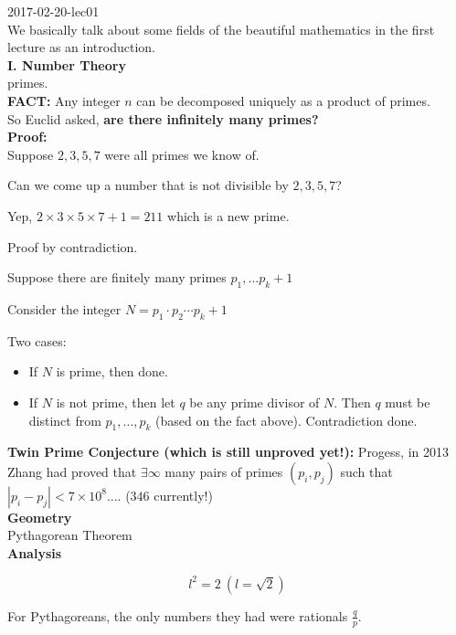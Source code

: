 \documentclass[a4paper, 11pt, twoside]{article}
\begin{document}
2017-02-20-lec01
\\

We basically talk about some fields of the beautiful mathematics in the first lecture as an introduction.
\\

\textbf{I. Number Theory}
\\

primes.
\\

\textbf{FACT:} Any integer $n$ can be decomposed uniquely as a product of primes.
\\

So Euclid asked, \textbf{are there infinitely many primes?}
\\

\textbf{Proof:}
\\

Suppose $2, 3, 5, 7$ were all primes we know of.

Can we come up a number that is not divisible by $2, 3, 5, 7$?

Yep, $2\times3\times5\times7+1=211$ which is a new prime. 

Proof by contradiction.

Suppose there are finitely many primes $p_1, \dots p_k + 1$

Consider the integer $N = p_1\cdot p_2 \cdots p_k + 1$

Two cases:

\begin{itemize}
	\item If $N$ is prime, then done.
	\item If $N$ is not prime, then let $q$ be any prime divisor of $N$. Then $q$ must be distinct from $p_1, \dots, p_k$ (based on the fact above). Contradiction done.
\end{itemize}

\textbf{Twin Prime Conjecture (which is still unproved yet!):} Progess, in 2013 Zhang had proved that $\exists \infty $ many pairs of primes $(p_i, p_j)$ such that $|p_i- p_j| < 7 \times 10^8$.... ($346$ currently!) 
\\

\textbf{Geometry}
\\

Pythagorean Theorem
\\

\textbf{Analysis}

\[ l^2 = 2\ (l = \sqrt{2}) \]

For Pythagoreans, the only numbers they had were rationals $\frac{q}{p}$.
\\
\end{document}

